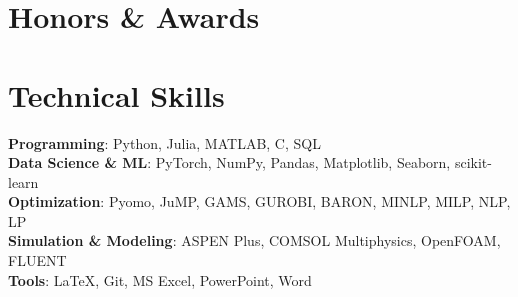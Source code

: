 \documentclass{resume}
\begin{document}

\section{Honors \& Awards}
  \resumeSubHeadingListStart
  \resumeSubHeadingListEnd



\section{Technical Skills}
 \begin{itemize}[leftmargin=0.15in, label={}]
    \small{\item{
     \textbf{Programming}{: Python, Julia, MATLAB, C, SQL} \\
     \textbf{Data Science \& ML}{: PyTorch, NumPy, Pandas, Matplotlib, Seaborn, scikit-learn} \\
     \textbf{Optimization}{: Pyomo, JuMP, GAMS, GUROBI, BARON, MINLP, MILP, NLP, LP} \\
     \textbf{Simulation \& Modeling}{: ASPEN Plus, COMSOL Multiphysics, OpenFOAM, FLUENT} \\
     \textbf{Tools}{: \LaTeX, Git, MS Excel, PowerPoint, Word}
    }}
 \end{itemize}
\end{document}
